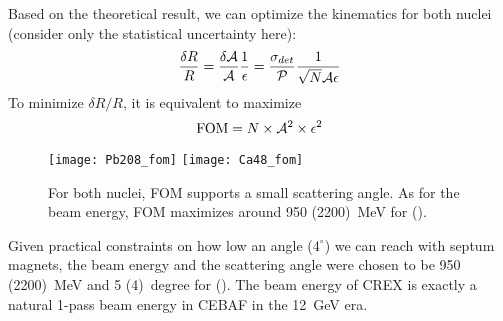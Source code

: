 Based on the theoretical result, we can optimize the kinematics for both nuclei 
(consider only the statistical uncertainty here):
\begin{equation}
    \frac{\delta R}{R} = \frac{\delta \mathcal{A}}{\mathcal{A}} \frac{1}{\epsilon} 
	= \frac{\sigma_{det}}{\mathcal{P}} \frac{1}{\sqrt{N} \mathcal{A} \epsilon}
\end{equation}
To minimize $\delta R/R$, it is equivalent to maximize 
\begin{equation}
    \text{FOM} = N\times \mathcal{A}^2 \times \epsilon^2
\end{equation}
\begin{figure}
    \texttt{[image: Pb208\_fom]}
    \texttt{[image: Ca48\_fom]}
    \caption[FOM]{For both nuclei, FOM supports a small scattering angle. As for the beam energy,
    FOM maximizes around 950 (2200)~MeV for \Pb (\Ca).}
\end{figure}

Given practical constraints on how low an angle ($4^\circ$) we can reach with 
septum magnets, the beam energy and the scattering angle were chosen to be 950 (2200)~MeV
and 5 (4)~degree for \Pb (\Ca). The beam energy of CREX is exactly a natural 1-pass beam
energy in CEBAF in the 12~GeV era.
\begin{comment}
For PREX-II: average sensitivity reduced by 5\% due to ${}^{12}C$ contamination
For CREX: average sensitivity reduced by 10\% due to ${}^{40}Ca$ contamination

While a quartz Cerenkov detector is valued for radiation hardness and insensitivity to soft backgrounds, there is a particular challenge for few GeV electrons. In this energy range, shower fluctuations in a thick or radiated detector significantly degrade energy resolution, while photon statistics degrade the energy resolution for a thin detector. The energy resolution $\Delta E$ at nominal electron energy E increases the statistical error that one would have with infinite resolution $\sigma_0$ to obtain the total statistical error:
$$ \sigma = \sigma_0\sqrt{1+\left(\frac{\Delta E}{E}\right)^2}$$
    
Based on experience in the PREX experiment, we expect an reduction of statistical precision of a factor of 1.06 due to detector resolution.
\end{comment}

